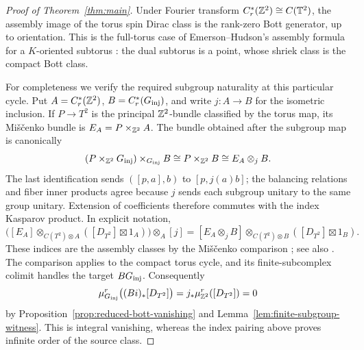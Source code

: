 \begin{proof}[Proof of Theorem~\ref{thm:main}]
Under Fourier transform $C_r^*(\mathbb Z^2)\cong C(\mathbb T^2)$, the assembly
image of the torus spin Dirac class is the rank-zero Bott generator, up to
orientation. This is the full-torus case of Emerson--Hudson's assembly
formula for a $K$-oriented subtorus \cite[Theorem~1.3]{EH20}: the dual
subtorus is a point, whose shriek class is the compact Bott class.

For completeness we verify the required subgroup naturality at this
particular cycle. Put $A=C_r^*(\mathbb Z^2)$, $B=C_r^*(G_{\mathrm{inj}})$, and write
$j:A\to B$ for the isometric inclusion. If $P\to T^2$ is the principal
$\mathbb Z^2$-bundle classified by the torus map, its Mi\v{s}\v{c}enko bundle
is $E_A=P\times_{\mathbb Z^2}A$. The bundle obtained after the subgroup map is
canonically
\[
 (P\times_{\mathbb Z^2}G_{\mathrm{inj}})\times_{G_{\mathrm{inj}}}B
 \cong P\times_{\mathbb Z^2}B
 \cong E_A\otimes_j B.
\]
The last identification sends $([p,a],b)$ to $[p,j(a)b]$; the balancing
relations and fiber inner products agree because $j$ sends each subgroup
unitary to the same group unitary. Extension of coefficients therefore
commutes with the index Kasparov product. In explicit notation,
\[
 \bigl([E_A]\otimes_{C(T^2)\otimes A}([D_{T^2}]\boxtimes1_A)\bigr)
      \otimes_A[j]
 =[E_A\otimes_j B]\otimes_{C(T^2)\otimes B}
      ([D_{T^2}]\boxtimes1_B).
\]
These indices are the assembly classes by the Mi\v{s}\v{c}enko comparison
\cite[Corollary~1.4 and diagram~(1.6)]{KP22}; see also
\cite[Proposition~3.7 and Theorem~4.1]{Land15}.
The comparison applies to the compact torus cycle, and its
finite-subcomplex colimit handles the target $BG_{\mathrm{inj}}$.
Consequently
\[
 \mu_{G_{\mathrm{inj}}}^r\bigl((Bi)_*[D_{T^2}]\bigr)
   =j_*\mu_{\mathbb Z^2}^r([D_{T^2}])=0
\]
by Proposition~\ref{prop:reduced-bott-vanishing} and
Lemma~\ref{lem:finite-subgroup-witness}. This is integral vanishing,
whereas the index pairing above proves infinite order of the source class.
\end{proof}
